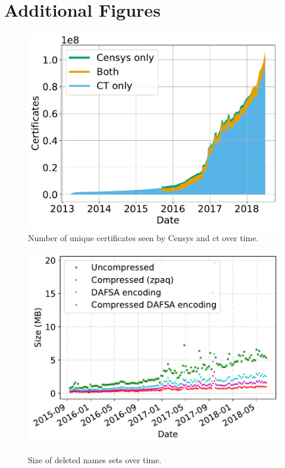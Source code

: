 \section{Additional Figures}


\begin{figure}
  \centering
  \includegraphics[width=\linewidth]{fig/cert_count_valid}
  \caption{Number of unique certificates seen by Censys and \ac{ct} over time.}
  \label{fig:count:certs}
\end{figure}

\begin{figure}[t]
  \centering
  \includegraphics[width=\linewidth]{fig/deleted_name_set_size}
  \label{fig:updates:deleted}
  \caption{Size of deleted names sets over time.}
\end{figure}


